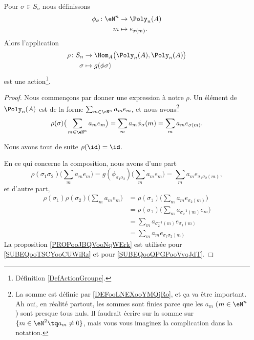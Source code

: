 \begin{lemma}       \label{LEMooIRVQooHvoNBq}
    Pour \( \sigma\in S_n\) nous définissons 
    \begin{equation}
        \begin{aligned}
            \phi_{\sigma}\colon \eN^n&\to \Poly_n(A) \\
            m&\mapsto e_{\sigma(m)}. 
        \end{aligned}
    \end{equation}
    Alors l'application
    \begin{equation}
        \begin{aligned}
            \rho\colon S_n&\to \Hom_A\big( \Poly_n(A),\Poly_n(A) \big) \\
            \sigma&\mapsto g(\phi{\sigma}) 
        \end{aligned}
    \end{equation}
    est une action\footnote{Définition \ref{DefActionGroupe}.}.
\end{lemma}

\begin{proof}
    Nous commençons par donner une expression à notre \( \rho\). Un élément de \( \Poly_n(A)\) est de la forme \( \sum_{m\in \eN^n}a_me_m\), et nous avons\footnote{La somme est définie par \ref{DEFooLNEXooYMQjRo}, et ça va être important. Ah oui, en réalité partout, les sommes sont finies parce que les \( a_m\) (\( m\in \eN^n\)) sont presque tous nuls. Il faudrait écrire sur la somme sur \(\{ m\in \eN^2\tq a_m\neq 0 \}\), mais vous vous imaginez la complication dans la notation.}
    \begin{equation}
        \rho(\sigma)\big( \sum_{m\in \eN^n}a_me_m \big)=\sum_ma_m\phi_{\sigma}(m)=\sum_ma_me_{\sigma(m)}.
    \end{equation}
    
    Nous avons tout de suite \( \rho(\id)=\id\).

    En ce qui concerne la composition, nous avons d'une part
    \begin{equation}
        \rho(\sigma_1\sigma_2)\big( \sum_ma_me_m \big)=g(\phi_{\sigma_1\sigma_2})\big( \sum_ma_me_m \big)=\sum_ma_me_{\sigma_1\sigma_2(m)},
    \end{equation}
    et d'autre part,
    \begin{subequations}
        \begin{align}
            \rho(\sigma_1)\rho(\sigma_2)\big( \sum_ma_me_m \big)&=\rho(\sigma_1)\big( \sum_ma_me_{\sigma_2(m)} \big)\\
            &=\rho(\sigma_1)\big( \sum_ma_{\sigma_2^{-1}(m)}e_m \big)   \label{SUBEQooTSCYooCUWiRz}\\
            &=\sum_ma_{\sigma_2^{-1}(m)}e_{\sigma_1(m)}\\
            &=\sum_ma_me_{\sigma_1\sigma_2(m)}      \label{SUBEQooQPGPooVvqJdT}
        \end{align}
    \end{subequations}
    La proposition \ref{PROPooJBQVooNqWErk} est utilisée pour \eqref{SUBEQooTSCYooCUWiRz} et pour \eqref{SUBEQooQPGPooVvqJdT}.
\end{proof}


